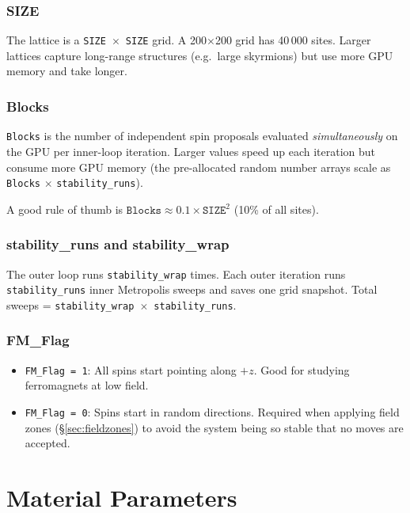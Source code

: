 \documentclass[12pt,a4paper]{article}
\newcommand{\code}[1]{\texttt{#1}}
\newcommand{\param}[1]{\texttt{#1}}
\begin{document}
\subsubsection{SIZE}
The lattice is a \param{SIZE}~$\times$~\param{SIZE} grid. A 200$\times$200
grid has 40\,000 sites. Larger lattices capture long-range structures (e.g.\
large skyrmions) but use more GPU memory and take longer.

\subsubsection{Blocks}
\param{Blocks} is the number of independent spin proposals evaluated
\emph{simultaneously} on the GPU per inner-loop iteration. Larger values
speed up each iteration but consume more GPU memory (the pre-allocated
random number arrays scale as \code{Blocks} $\times$ \code{stability\_runs}).

A good rule of thumb is $\texttt{Blocks} \approx 0.1 \times
\texttt{SIZE}^2$ (10\% of all sites).

\subsubsection{stability\_runs and stability\_wrap}
The outer loop runs \param{stability\_wrap} times. Each outer iteration runs
\param{stability\_runs} inner Metropolis sweeps and saves one grid snapshot.
Total sweeps = \param{stability\_wrap}~$\times$~\param{stability\_runs}.

\subsubsection{FM\_Flag}
\begin{itemize}
  \item \param{FM\_Flag = 1}: All spins start pointing along $+z$. Good for
        studying ferromagnets at low field.
  \item \param{FM\_Flag = 0}: Spins start in random directions. Required when
        applying field zones (§\ref{sec:fieldzones}) to avoid the system being
        so stable that no moves are accepted.
\end{itemize}

\section{Material Parameters}
\end{document}
